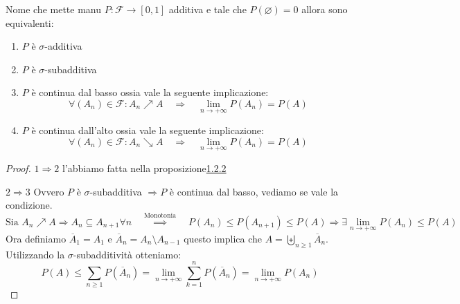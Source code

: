 \documentclass[11pt, a4paper, twoside]{article}
\begin{document}
\begin{prop}{Nome che mette manu}{}
	$P:\mathcal F \rightarrow [0,1]$ additiva e tale che $P(\varnothing)=0$ allora sono equivalenti:
	\begin{enumerate}
		\item $P$ è $\sigma$-additiva
		\item $P$ è $\sigma$-subadditiva
		\item $P$ è continua dal basso ossia vale la seguente implicazione:
			\[
				\forall (A_n)\in\mathcal F: A_n\nearrow A\quad \Rightarrow\quad \lim_{n\to+\infty} P(A_n)=P(A)
			\]
		\item $P$ è continua dall'alto ossia vale la seguente implicazione:
			\[
				\forall (A_n)\in\mathcal F: A_n\searrow A\quad \Rightarrow\quad \lim_{n\to+\infty} P(A_n)=P(A)
			\]
	\end{enumerate}
\end{prop}
\begin{proof}
	$1\Rightarrow 2$ l'abbiamo fatta nella proposizione\hyperref[sub-additività]{1.2.2}

	$2\Rightarrow 3$ Ovvero $P$ è $\sigma$-subadditiva $\Rightarrow P$ è continua dal basso, vediamo se vale la condizione. 
	\[
		\text{Sia }A_n\nearrow A\Rightarrow A_n\subseteq A_{n+1}\forall n\quad\stackrel{\text{Monotonia}}{\implies}\quad P(A_n)\leq P(A_{n+1})\leq P(A) \Rightarrow \exists \lim_{n\to +\infty} P(A_n)\leq P(A)
	\]
	Ora definiamo $\overline A_1=A_1$ e $\overline A_n=A_n\setminus A_{n-1}$ questo implica che $A=\biguplus\limits_{n\geq1} \overline A_n$. Utilizzando la $\sigma$-subadditività otteniamo:
	\[
		P(A)\leq\sum\limits_{n\geq 1} P(\overline A_n)= \lim_{n\to +\infty}\sum\limits_{k=1}^n P(\overline A_n)= \lim_{n\to +\infty} P(A_n)
	\]
\end{proof}
\end{document}
